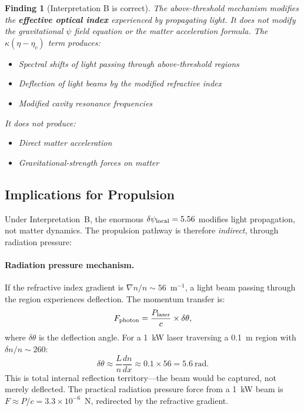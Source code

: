\documentclass[12pt,a4paper]{article}
\newtheorem{finding}{Finding}
\theoremstyle{remark}
\begin{document}
\begin{finding}[Interpretation B is correct]
The above-threshold mechanism modifies the \textbf{effective optical index}
experienced by propagating light. It does \emph{not} modify the gravitational
$\psi$ field equation or the matter acceleration formula. The $\kappa(\eta - \eta_c)$
term produces:
\begin{itemize}
\item Spectral shifts of light passing through above-threshold regions
\item Deflection of light beams by the modified refractive index
\item Modified cavity resonance frequencies
\end{itemize}
It does \emph{not} produce:
\begin{itemize}
\item Direct matter acceleration
\item Gravitational-strength forces on matter
\end{itemize}
\end{finding}

\subsection{Implications for Propulsion}

Under Interpretation~B, the enormous $\delta\psi_{\rm local} = 5.56$ modifies
light propagation, not matter dynamics. The propulsion pathway is therefore
\emph{indirect}, through radiation pressure:

\paragraph{Radiation pressure mechanism.}
If the refractive index gradient is $\nabla n/n \sim 56$~m$^{-1}$, a light
beam passing through the region experiences deflection. The momentum transfer
is:
\begin{equation}
F_{\rm photon} = \frac{P_{\rm laser}}{c} \times \delta\theta,
\end{equation}
where $\delta\theta$ is the deflection angle. For a 1~kW laser traversing
a 0.1~m region with $\delta n/n \sim 260$:
\begin{equation}
\delta\theta \approx \frac{L}{n}\frac{dn}{dx} \approx 0.1 \times 56 = 5.6~\text{rad}.
\end{equation}
This is total internal reflection territory---the beam would be captured,
not merely deflected. The practical radiation pressure force from a 1~kW beam
is $F \approx P/c = 3.3 \times 10^{-6}$~N, redirected by the refractive
gradient.
\end{document}
